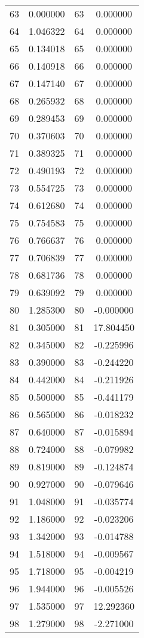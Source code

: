 \documentclass[12pt]{article}
\begin{document}
\begin{longtable}{@{}cccc@{}}
63 & 0.000000 & 63 & 0.000000 \\
64 & 1.046322 & 64 & 0.000000 \\
65 & 0.134018 & 65 & 0.000000 \\
66 & 0.140918 & 66 & 0.000000 \\
67 & 0.147140 & 67 & 0.000000 \\
68 & 0.265932 & 68 & 0.000000 \\
69 & 0.289453 & 69 & 0.000000 \\
70 & 0.370603 & 70 & 0.000000 \\
71 & 0.389325 & 71 & 0.000000 \\
72 & 0.490193 & 72 & 0.000000 \\
73 & 0.554725 & 73 & 0.000000 \\
74 & 0.612680 & 74 & 0.000000 \\
75 & 0.754583 & 75 & 0.000000 \\
76 & 0.766637 & 76 & 0.000000 \\
77 & 0.706839 & 77 & 0.000000 \\
78 & 0.681736 & 78 & 0.000000 \\
79 & 0.639092 & 79 & 0.000000 \\
80 & 1.285300 & 80 & -0.000000 \\
81 & 0.305000 & 81 & 17.804450 \\
82 & 0.345000 & 82 & -0.225996 \\
83 & 0.390000 & 83 & -0.244220 \\
84 & 0.442000 & 84 & -0.211926 \\
85 & 0.500000 & 85 & -0.441179 \\
86 & 0.565000 & 86 & -0.018232 \\
87 & 0.640000 & 87 & -0.015894 \\
88 & 0.724000 & 88 & -0.079982 \\
89 & 0.819000 & 89 & -0.124874 \\
90 & 0.927000 & 90 & -0.079646 \\
91 & 1.048000 & 91 & -0.035774 \\
92 & 1.186000 & 92 & -0.023206 \\
93 & 1.342000 & 93 & -0.014788 \\
94 & 1.518000 & 94 & -0.009567 \\
95 & 1.718000 & 95 & -0.004219 \\
96 & 1.944000 & 96 & -0.005526 \\
97 & 1.535000 & 97 & 12.292360 \\
98 & 1.279000 & 98 & -2.271000 \\

\end{longtable}
\end{document}
